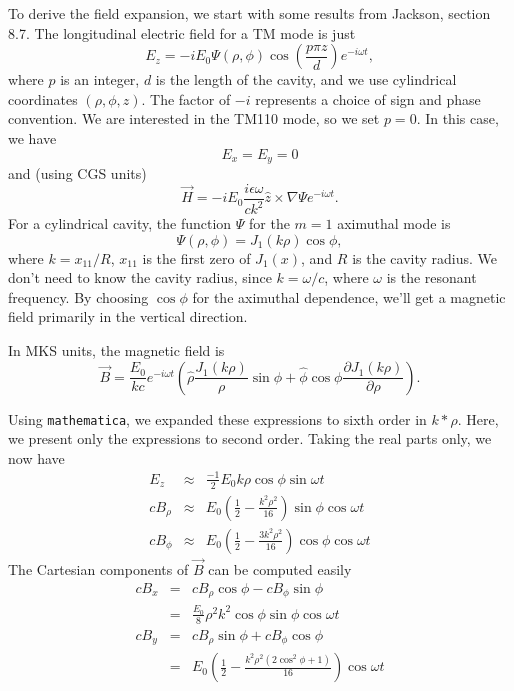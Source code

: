 To derive the field expansion, we start with some results from
Jackson\cite{Jackson}, section 8.7.  The longitudinal electric field
for a TM mode is just
\begin{equation}
E_z = - i E_0 \Psi(\rho, \phi) \cos \left(\frac{p \pi z}{d}\right) e^{-i\omega t},
\end{equation}
where $p$ is an integer, $d$ is the length of the cavity, and we use
cylindrical coordinates $(\rho, \phi, z)$.  The factor of $-i$ represents a
choice of sign and phase convention.  We are interested in the
TM110 mode, so we set $p=0$.  In this case, we have
\begin{equation}
E_x = E_y = 0 
\end{equation}
and (using CGS units)
\begin{equation}
\vec{H} = - i E_0 \frac{i \epsilon \omega}{c k^2} \hat{z} \times \nabla \Psi e^{-i \omega t}.
\end{equation}
For a cylindrical cavity, the function $\Psi$ for the $m=1$ aximuthal mode is 
\begin{equation}
\Psi(\rho, \phi) = J_1 (k \rho) \cos \phi,
\end{equation}
where $k = x_{11}/R$, $x_{11}$ is the first zero of $J_1(x)$, and $R$ is the cavity radius.
We don't need to know the cavity radius, since $k = \omega/c$, where $\omega$ is the
resonant frequency.  By choosing $\cos\phi$ for the aximuthal dependence, we'll get 
a magnetic field primarily in the vertical direction.

In MKS units, the magnetic field is
\begin{equation}
\vec{B} = \frac{E_0}{k c} e^{-i \omega t} \left( \hat{\rho} \frac{J_1(k\rho)}{\rho} \sin \phi
        + \hat{\phi} \cos\phi \frac{\partial J_1(k\rho)}{\partial \rho}\right).
\end{equation}

Using {\tt mathematica}, we expanded these expressions to sixth order
in $k*\rho$.  Here, we present only the expressions to second
order. Taking the real parts only, we now have
\begin{eqnarray}
E_z & \approx & \frac{-1}{2} E_0 k \rho \cos \phi \sin \omega t \\
c B_\rho  & \approx & E_0 \left(\frac{1}{2} - \frac{k^2 \rho^2}{16}\right)\sin\phi \cos\omega t \\
c B_\phi  & \approx & E_0 \left(\frac{1}{2} - \frac{3 k^2 \rho^2}{16}\right)\cos\phi \cos\omega t 
\end{eqnarray}
The Cartesian components of $\vec{B}$ can be computed easily
\begin{eqnarray}
c B_x & = & c B_\rho\cos\phi - c B_\phi\sin\phi \\
      & = & \frac{E_0}{8} \rho^2 k^2 \cos\phi \sin\phi \cos\omega t \\
c B_y & = & c B_\rho\sin\phi + c B_\phi\cos\phi \\
      & = & E_0 \left(\frac{1}{2} - \frac{k^2\rho^2 (2 \cos^2\phi + 1)}{16}\right) \cos\omega t 
\end{eqnarray}

